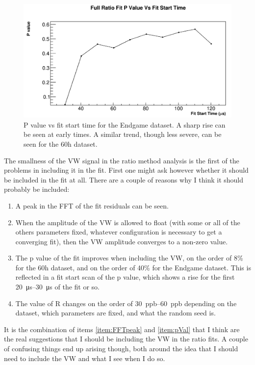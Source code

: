 \documentclass[12pt,letterpaper]{article}
\begin{document}
\begin{figure}[]
    \centering
    \includegraphics[width=.7\textwidth]{Pvalue_Endgame}
    \caption[]{P value vs fit start time for the Endgame dataset. A sharp rise can be seen at early times. A similar trend, though less severe, can be seen for the 60h dataset.}
    \label{fig:Pvalue_Endgame}
\end{figure}


\clearpage






The smallness of the VW signal in the ratio method analysis is the first of the problems in including it in the fit. First one might ask however whether it should be included in the fit at all. There are a couple of reasons why I think it should probably be included:
\begin{enumerate}
	\item\label{item:FFTpeak}{A peak in the FFT of the fit residuals can be seen.}
	\item\label{item:VWamp}{When the amplitude of the VW is allowed to float (with some or all of the others parameters fixed, whatever configuration is necessary to get a converging fit), then the VW amplitude converges to a non-zero value.}
	\item\label{item:pVal}{The p value of the fit improves when including the VW, on the order of 8\% for the 60h dataset, and on the order of 40\% for the Endgame dataset. This is reflected in a fit start scan of the p value, which shows a rise for the first \SIrange{20}{30}{\micro s} of the fit or so.}
	\item\label{item:Rchange}{The value of R changes on the order of \SIrange{30}{60}{ppb} depending on the dataset, which parameters are fixed, and what the random seed is.}
\end{enumerate}
It is the combination of items \ref{item:FFTpeak} and \ref{item:pVal} that I think are the real suggestions that I should be including the VW in the ratio fits. A couple of confusing things end up arising though, both around the idea that I should need to include the VW and what I see when I do so.
\end{document}
